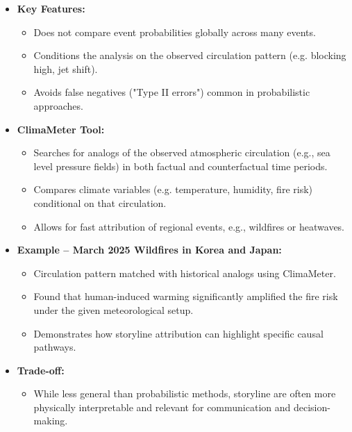 \documentclass[fontsize=8pt, a4paper, landscape, fleqn]{scrartcl}
\begin{document}
\begin{multicols*}{3}[\raggedcolumns]
\begin{itemize}
    \item \textbf{Key Features:}
    \begin{itemize}
        \item Does not compare event probabilities globally across many events.
        \item Conditions the analysis on the observed circulation pattern (e.g. blocking high, jet shift).
        \item Avoids false negatives ("Type II errors") common in probabilistic approaches.
    \end{itemize}

    \item \textbf{ClimaMeter Tool:}
    \begin{itemize}
        \item Searches for analogs of the observed atmospheric circulation (e.g., sea level pressure fields) in both factual and counterfactual time periods.
        \item Compares climate variables (e.g. temperature, humidity, fire risk) conditional on that circulation.
        \item Allows for fast attribution of regional events, e.g., wildfires or heatwaves.
    \end{itemize}

    \item \textbf{Example – March 2025 Wildfires in Korea and Japan:}
    \begin{itemize}
        \item Circulation pattern matched with historical analogs using ClimaMeter.
        \item Found that human-induced warming significantly amplified the fire risk under the given meteorological setup.
        \item Demonstrates how storyline attribution can highlight specific causal pathways.
    \end{itemize}

    \item \textbf{Trade-off:}
    \begin{itemize}
        \item While less general than probabilistic methods, storyline are often more physically interpretable and relevant for communication and decision-making.
    \end{itemize}
\end{itemize}


\end{multicols*}
\end{document}
